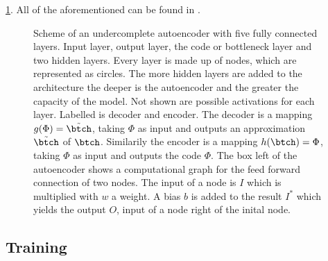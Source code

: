 \cref{Fig:Autoencoder}. All of the aforementioned can be found in \cite{Goodfellow}.\\
\begin{figure}
	\centering
	
	\caption{\footnotesize Scheme of an undercomplete autoencoder with five fully connected layers. Input layer, output layer, the code or bottleneck layer and two hidden layers. Every layer is made up of nodes, which are represented as circles. The more hidden layers are added to the architecture the deeper is the autoencoder and the greater the capacity of the model. Not shown are possible activations for each layer. Labelled is decoder and encoder. The decoder is a mapping \(g(\Phi)=\tilde{\btch}\), taking \(\Phi\) as input and outputs an approximation \(\tilde{\btch}\) of \(\btch\). Similarily the encoder is a mapping \(h(\btch)=\Phi\), taking \(\Phi\) as input and outputs the code \(\Phi\). The box left of the autoencoder shows a computational graph for the feed forward connection of two nodes. The input of a node is \(I\) which is multiplied with \(w\) a weight. A bias \(b\) is added to the result \(I^*\) which yields the output \(O\), input of a node right of the inital node.}
	\label{Fig:Autoencoder}
\end{figure}
\subsection{Training}

